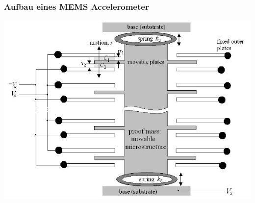 \documentclass[10pt,a4paper,oneside]{beamer}
\begin{document}
\begin{frame}
	\frametitle{Aufbau eines MEMS Accelerometer}
\includegraphics[width=\textwidth]{images/acceleromter_structure.png}

\end{frame}
\end{document}
